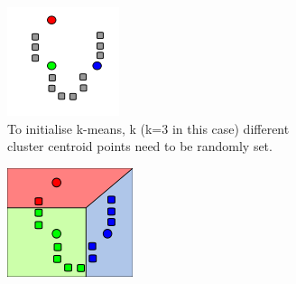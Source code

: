 \begin{figure}[H]
    \centering
    \begin{subfigure}[H]{0.2\textwidth}
        \includegraphics[width=\textwidth]{Images/Methods/K-means/K_Means_Example_Step_1.png}
        \vspace{-20pt}
        \caption{To initialise k-means, k (k=3 in this case) different cluster centroid points need to be randomly set.}
    \end{subfigure}
    \quad
    \begin{subfigure}[H]{0.2\textwidth}
        \includegraphics[width=\textwidth]{Images/Methods/K-means/K_Means_Example_Step_2.png}

\end{subfigure}
\end{figure}
